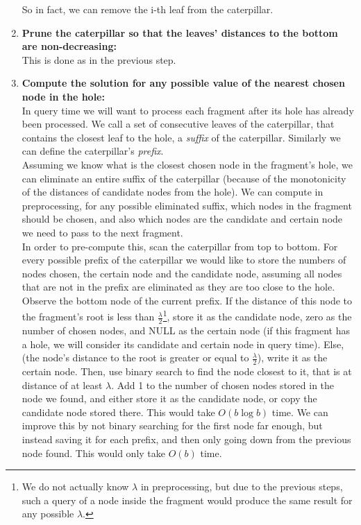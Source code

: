 \documentclass[11pt,a4paper]{article}
\theoremstyle{definition}
\theoremstyle{remark}
\begin{document}
\begin{enumerate}
So in fact, we can remove the i-th leaf from the caterpillar.
\item\textbf{Prune the caterpillar so that the leaves' distances to the bottom are non-decreasing:}\\ \label{making distances from the hole monotone}
This is done as in the previous step.
\item\textbf{Compute the solution for any possible value of the nearest chosen node in the hole:}\\
In query time we will want to process each fragment after its hole has already been processed.
We call a set of consecutive leaves of the caterpillar, that contains the closest leaf to the hole, a \emph{suffix} of the caterpillar. Similarly we can define the caterpillar's \emph{prefix}.\\
Assuming we know what is the closest chosen node in the fragment's hole, we can eliminate an entire suffix of the caterpillar (because of the monotonicity of the distances of candidate nodes from the hole). We can compute in preprocessing, for any possible eliminated suffix, which nodes in the fragment should be chosen, and also which nodes are the candidate and certain node we need to pass to the next fragment.\\
In order to pre-compute this, scan the caterpillar from top to bottom. For every possible prefix of the caterpillar we would like to store the numbers of nodes chosen, the certain node and the candidate node, assuming all nodes that are not in the prefix are eliminated as they are too close to the hole. Observe the bottom node of the current prefix. If the distance of this node to the fragment's root is less than $\frac{\lambda}{2}$\footnote{We do not actually know $\lambda$ in preprocessing, but due to the previous steps, such a query of a node inside the fragment would produce the same result for any possible $\lambda$.}, store it as the candidate node, zero as the number of chosen nodes, and NULL as the certain node (if this fragment has a hole, we will consider its candidate and certain node in query time). Else, (the node's distance to the root is greater or equal to $\frac{\lambda}{2}$), write it as the certain node. Then, use binary search to find the node closest to it, that is at distance of at least $\lambda$. Add 1 to the number of chosen nodes stored in the node we found, and either store it as the candidate node, or copy the candidate node stored there. This would take $O(b \log b)$ time. We can improve this by not binary searching for the first node far enough, but instead saving it for each prefix, and then only going down from the previous node found. This would only take $O(b)$ time.
\end{enumerate}
\end{document}
